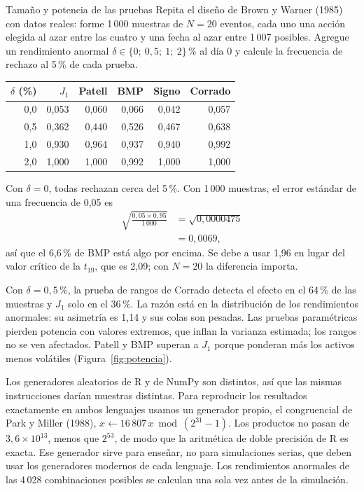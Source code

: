 \begin{ejresuelto}{Tamaño y potencia de las pruebas}\label{ej:potencia}
\enunciado Repita el diseño de Brown y Warner (1985) con datos reales: forme 1\,000 muestras de $N=20$ eventos, cada uno una
acción elegida al azar entre las cuatro y una fecha al azar entre 1\,007 posibles. Agregue un rendimiento anormal
$\delta\in\{0;\ 0{,}5;\ 1;\ 2\}$\,\% al día 0 y calcule la frecuencia de rechazo al 5\,\% de cada prueba.

\solucion
{}
\begin{center}\small
\begin{tabular}{@{}rrrrrr@{}}
\toprule
$\delta$ (\%) & $J_1$ & Patell & BMP & Signo & Corrado \\
\midrule
0,0 & 0,053 & 0,060 & 0,066 & 0,042 & 0,057 \\
0,5 & 0,362 & 0,440 & 0,526 & 0,467 & 0,638 \\
1,0 & 0,930 & 0,964 & 0,937 & 0,940 & 0,992 \\
2,0 & 1,000 & 1,000 & 0,992 & 1,000 & 1,000 \\
\bottomrule
\end{tabular}
\end{center}

 Con $\delta=0$, todas rechazan cerca del 5\,\%. Con 1\,000 muestras, el error estándar de una frecuencia de
0,05 es
\begin{align*}
  \sqrt{\frac{0{,}05\times0{,}95}{1\,000}} &= \sqrt{0{,}0000475}\\
                                         &= 0{,}0069,
\end{align*}
así que el 6,6\,\% de BMP está algo por encima. Se debe a usar 1,96 en lugar del valor crítico de la $t_{19}$, que es 2,09; con
$N=20$ la diferencia importa.

 Con $\delta=0{,}5$\,\%, la prueba de rangos de Corrado detecta el efecto en el 64\,\% de las muestras y
$J_1$ solo en el 36\,\%. La razón está en la distribución de los rendimientos anormales: su asimetría es 1,14 y sus colas son
pesadas. Las pruebas paramétricas pierden potencia con valores extremos, que inflan la varianza estimada; los rangos no se
ven afectados. Patell y BMP superan a $J_1$ porque ponderan más los activos menos volátiles (Figura~\ref{fig:potencia}).


\RvsPy Los generadores aleatorios de R y de NumPy son distintos, así que las mismas instrucciones darían muestras distintas.
Para reproducir los resultados exactamente en ambos lenguajes usamos un generador propio, el congruencial de Park y Miller
(1988), $x\leftarrow16\,807\,x \bmod (2^{31}-1)$. Los productos no pasan de $3{,}6\times10^{13}$, menos que $2^{53}$, de modo que la
aritmética de doble precisión de R es exacta. Ese generador sirve para enseñar, no para simulaciones serias, que deben usar
los generadores modernos de cada lenguaje. Los rendimientos anormales de las 4\,028 combinaciones posibles se calculan una
sola vez antes de la simulación.


\end{ejresuelto}

